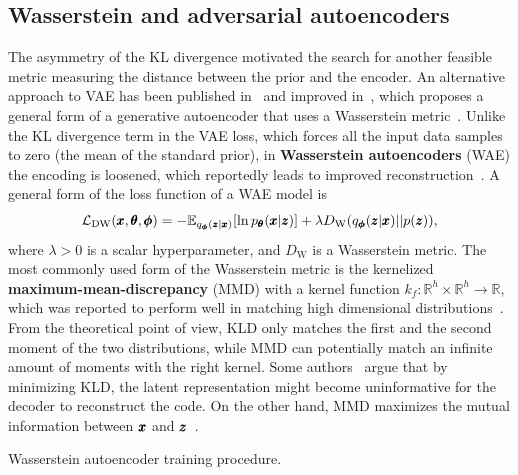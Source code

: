 \subsection{Wasserstein and adversarial autoencoders} \label{sec:wae}
The asymmetry of the KL divergence motivated the search for another feasible metric measuring the distance between the prior and the encoder. An alternative approach to VAE has been published in~\cite{mescheder2017adversarial} and improved in~\cite{tolstikhin2017wasserstein}, which proposes a general form of a generative autoencoder that uses a Wasserstein metric~\cite{givens1984class}. Unlike the KL divergence term in the VAE loss, which forces all the input data samples to zero (the mean of the standard prior), in \textbf{Wasserstein autoencoders} (WAE) the encoding is loosened, which reportedly leads to improved reconstruction~\cite{tolstikhin2017wasserstein}. A general form of the loss function of a WAE model is
\begin{equation} \label{eq:general_wae_loss}
    \mathcal{L}_{\text{DW}} (\vc{x}, \vc{\theta}, \vc{\phi}) = - \mathbb{E}_{q_{\vc{\phi}}(\vc{z}|\vc{x})} \left[ \ln p_{\vc{\theta}}(\vc{x}|\vc{z}) \right] + \lambda D_{\text{W}} \left( q_{\vc{\phi}}(\vc{z}|\vc{x}) || p(\vc{z}) \right),
\end{equation}
where $\lambda >0$  is a scalar hyperparameter, and $D_{\text{W}}$ is a Wasserstein metric. The most commonly used form of the Wasserstein metric is the kernelized \textbf{maximum-mean-discrepancy} (MMD) with a kernel function $k_f:\mathbb{R}^h \times \mathbb{R}^h \rightarrow \mathbb{R}$, which was reported to perform well in matching high dimensional distributions~\cite{zhao2017infovae}. From the theoretical point of view, KLD only matches the first and the second moment of the two distributions, while MMD can potentially match an infinite amount of moments with the right kernel. Some authors~\cite{tolstikhin2017wasserstein} argue that by minimizing KLD, the latent representation might become uninformative for the decoder to reconstruct the code. On the other hand, MMD maximizes the mutual information between $\pmb{{x}}$  and $\pmb{{z}}$~\cite{zhao2017infovae}.

\begin{algorithm}

\caption{Wasserstein autoencoder training procedure.}
\label{alg:infovae}
\end{algorithm}

